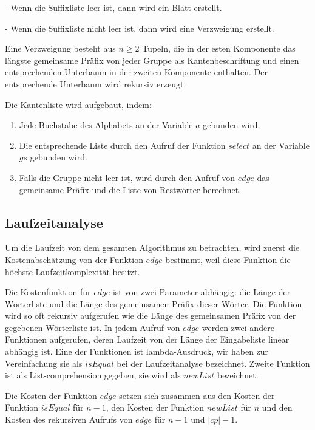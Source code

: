 \documentclass[12pt]{report}
\newcommand{\abs}[1]{\left|#1\right|}
\begin{document}
    - Wenn die Suffixliste leer ist, dann wird ein Blatt erstellt.

    - Wenn die Suffixliste nicht leer ist, dann wird eine Verzweigung erstellt.

Eine Verzweigung besteht aus $n \ge 2$ Tupeln, die in der esten Komponente das längste gemeinsame Präfix von jeder Gruppe als Kantenbeschriftung und einen entsprechenden Unterbaum in der zweiten Komponente enthalten. Der entsprechende Unterbaum wird rekursiv erzeugt.

Die Kantenliste wird aufgebaut, indem:
\begin{enumerate}
    \item Jede Buchstabe des Alphabets an der Variable $a$ gebunden wird.
    \item Die entsprechende Liste durch den Aufruf der Funktion $select$ an der Variable $gs$ gebunden wird.
    \item Falls die Gruppe nicht leer ist, wird durch den Aufruf von $edge$ das gemeinsame Präfix und die Liste von Restwörter berechnet.
\end{enumerate}

\subsection{Laufzeitanalyse}
\label{sec:Laufzeitanalyse}

Um die Laufzeit von dem gesamten Algorithmus zu betrachten, wird zuerst die Kostenabschätzung von der Funktion $edge$ bestimmt, weil diese Funktion die höchste Laufzeitkomplexität besitzt.

Die Kostenfunktion für $edge$ ist von zwei Parameter abhängig: die Länge der Wörterliste und die Länge des gemeinsamen Präfix dieser Wörter. Die Funktion wird so oft rekursiv aufgerufen wie die Länge des gemeinsamen Präfix von der gegebenen Wörterliste ist. In jedem Aufruf von $edge$ werden zwei andere Funktionen aufgerufen, deren Laufzeit von der Länge der Eingabeliste linear abhängig ist. Eine der Funktionen ist lambda-Ausdruck, wir haben zur Vereinfachung sie als $isEqual$ bei der Laufzeitanalyse bezeichnet. Zweite Funktion ist als List-comprehension gegeben, sie wird als $newList$ bezeichnet.

Die Kosten der Funktion $edge$ setzen sich zusammen aus den Kosten der Funktion $isEqual$ für $n - 1$, den Kosten der Funktion $newList$ für $n$ und den Kosten des rekursiven Aufrufs von $edge$ für $n - 1$ und $\abs{cp} - 1$.
\end{document}

